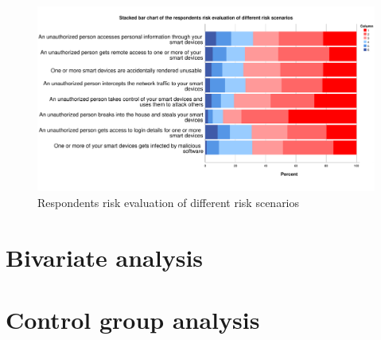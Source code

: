 \begin{figure}[H]
    \centering
    \includegraphics[scale=0.4]{figures/diagrams/risk_perception.pdf}
    \caption{Respondents risk evaluation of different risk scenarios}
    \label{fig:risk perception}
\end{figure}

\section{Bivariate analysis}


\section{Control group analysis}
